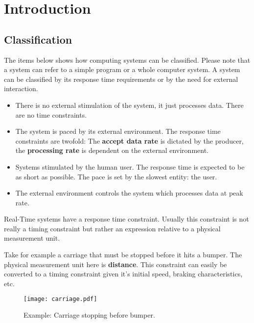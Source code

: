 \documentclass[../main.tex]{subfiles}
\begin{document}
\chapter{Introduction}

\section{Classification}

The items below shows how computing systems can be classified. Please note that a system can refer to a simple program or a whole computer system. A system can be classified by its response time requirements or by the need for external interaction.

\begin{itemize}
	\item {}
	There is no external stimulation of the system, it just processes data. There are no time constraints.
	\item {}
	The system is paced by its external environment. The response time constraints are twofold: The \textbf{accept data rate} is dictated by the producer, the \textbf{processing rate} is dependent on the external environment.
	\item {}
	Systems stimulated by the human user. The response time is expected to be as short as possible. The pace is set by the slowest entity: the user.
	\item {}
	The external environment controls the system which processes data at peak rate.
\end{itemize}

Real-Time systems have a response time constraint. Usually this constraint is not really a timing constraint but rather an expression relative to a physical measurement unit.

\begin{exmp}
Take for example a carriage that must be stopped before it hits a bumper. The physical measurement unit here is \textbf{distance}. This constraint can easily be converted to a timing constraint given it's initial speed, braking characteristics, etc.
\begin{figure}[H]
    \centering
    \texttt{[image: carriage.pdf]}
    \caption{Example: Carriage stopping before bumper.}
    \label{carriage}
\end{figure}
\end{exmp}
\end{document}
